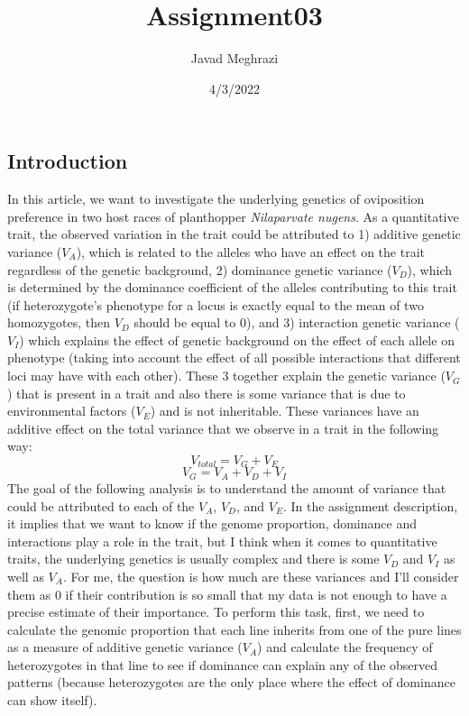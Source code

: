 \documentclass[
]{article}
\title{Assignment03}
\author{Javad Meghrazi}
\date{4/3/2022}
\begin{document}
\maketitle

\hypertarget{introduction}{%
\subsection{Introduction}\label{introduction}}

In this article, we want to investigate the underlying genetics of
oviposition preference in two host races of planthopper
\emph{Nilaparvate nugens}. As a quantitative trait, the observed
variation in the trait could be attributed to 1) additive genetic
variance (\(V_A\)), which is related to the alleles who have an effect
on the trait regardless of the genetic background, 2) dominance genetic
variance (\(V_D\)), which is determined by the dominance coefficient of
the alleles contributing to this trait (if heterozygote's phenotype for
a locus is exactly equal to the mean of two homozygotes, then \(V_D\)
should be equal to 0), and 3) interaction genetic variance (\(V_I\))
which explains the effect of genetic background on the effect of each
allele on phenotype (taking into account the effect of all possible
interactions that different loci may have with each other). These 3
together explain the genetic variance (\(V_G\)) that is present in a
trait and also there is some variance that is due to environmental
factors (\(V_E\)) and is not inheritable. These variances have an
additive effect on the total variance that we observe in a trait in the
following way: \[ V_{total} = V_G + V_E\] \[ V_G = V_A + V_D + V_I\] The
goal of the following analysis is to understand the amount of variance
that could be attributed to each of the \(V_A\), \(V_D\), and \(V_E\).
In the assignment description, it implies that we want to know if the
genome proportion, dominance and interactions play a role in the trait,
but I think when it comes to quantitative traits, the underlying
genetics is usually complex and there is some \(V_D\) and \(V_I\) as
well as \(V_A\). For me, the question is how much are these variances
and I'll consider them as 0 if their contribution is so small that my
data is not enough to have a precise estimate of their importance. To
perform this task, first, we need to calculate the genomic proportion
that each line inherits from one of the pure lines as a measure of
additive genetic variance (\(V_A\)) and calculate the frequency of
heterozygotes in that line to see if dominance can explain any of the
observed patterns (because heterozygotes are the only place where the
effect of dominance can show itself).
\end{document}
